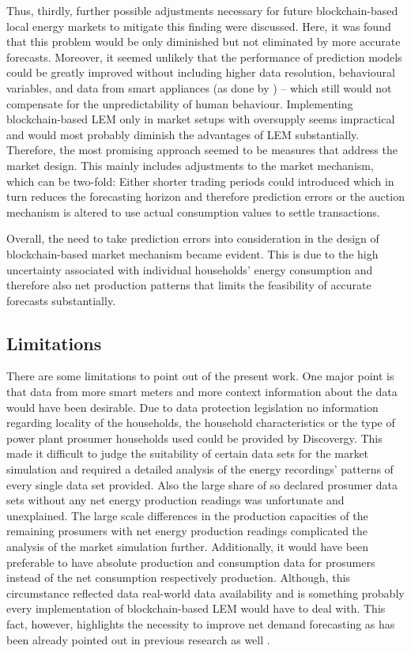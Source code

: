 Thus, thirdly, further possible adjustments necessary for future blockchain-based local energy markets to mitigate this finding were discussed. Here, it was found that this problem would be only diminished but not eliminated by more accurate forecasts. Moreover, it seemed unlikely that the performance of prediction models could be greatly improved without including higher data resolution, behavioural variables, and data from smart appliances (as done by \citet{Kong:2018}) -- which still would not compensate for the unpredictability of human behaviour. Implementing blockchain-based LEM only in market setups with oversupply seems impractical and would most probably diminish the advantages of LEM substantially. Therefore, the most promising approach seemed to be measures that address the market design. This mainly includes adjustments to the market mechanism, which can be two-fold: Either shorter trading periods could introduced which in turn reduces the forecasting horizon and therefore prediction errors or the auction mechanism is altered to use actual consumption values to settle transactions.

Overall, the need to take prediction errors into consideration in the design of blockchain-based market mechanism became evident. This is due to the high uncertainty associated with individual households' energy consumption and therefore also net production patterns that limits the feasibility of accurate forecasts substantially.




\subsection{Limitations}\label{Sec:Conclusion;Subsec:Discussion}

There are some limitations to point out of the present work. One major point is that data from more smart meters and more context information about the data would have been desirable. Due to data protection legislation no information regarding locality of the households, the household characteristics or the type of power plant prosumer households used could be provided by Discovergy. This made it difficult to judge the suitability of certain data sets for the market simulation and required a detailed analysis of the energy recordings' patterns of every single data set provided. Also the large share of so declared prosumer data sets without any net energy production readings was unfortunate and unexplained. The large scale differences in the production capacities of the remaining prosumers with net energy production readings complicated the analysis of the market simulation further. Additionally, it would have been preferable to have absolute production and consumption data for prosumers instead of the net consumption respectively production. Although, this circumstance reflected data real-world data availability and is something probably every implementation of blockchain-based LEM would have to deal with. This fact, however, highlights the necessity to improve net demand forecasting as has been already pointed out in previous research as well \citep[e.g.,][]{Meer:2018, Hong:2016}.

